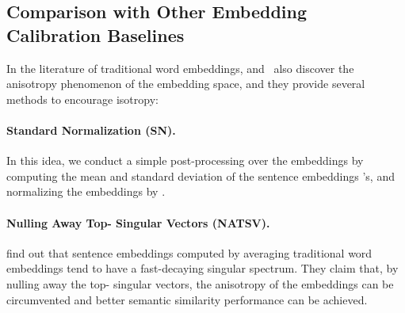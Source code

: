 \documentclass[11pt,a4paper]{article}
\begin{document}
\subsection{Comparison with Other Embedding Calibration Baselines}
\begin{table}[!h]
\centering
{}
\caption{Comparing flow-based method with baselines on STS-B.  is selected among  on the validation set. We report the Spearman’s rank correlation ().}
\label{tbl:baselines}
\vspace{-10pt}
\end{table}

In the literature of traditional word embeddings, \citet{arora2016simple} and~\citet{mu2017all} also discover the anisotropy phenomenon of the embedding space, and they provide several methods to encourage isotropy:

\paragraph{Standard Normalization (SN).}
In this idea, we conduct a simple post-processing over the embeddings by computing the mean  and standard deviation  of the sentence embeddings 's, and normalizing the embeddings by .

\paragraph{Nulling Away Top- Singular Vectors (NATSV).} 
\citet{mu2017all} find out that sentence embeddings computed by averaging traditional word embeddings  tend to have a fast-decaying singular spectrum. They claim that, by nulling away the top- singular vectors, the anisotropy of the embeddings can be circumvented and better semantic similarity performance can be achieved.
\end{document}
